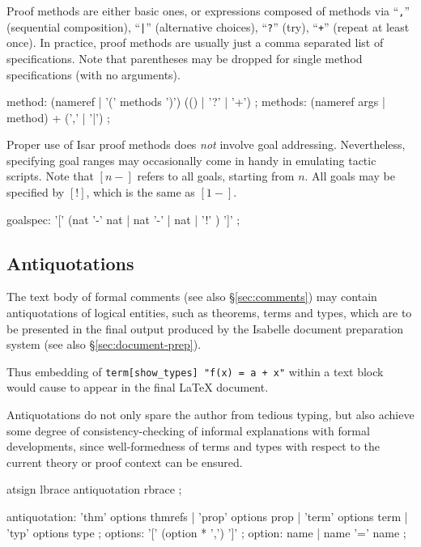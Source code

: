 Proof methods are either basic ones, or expressions composed of methods via
``\texttt{,}'' (sequential composition), ``\texttt{|}'' (alternative choices),
``\texttt{?}'' (try), ``\texttt{+}'' (repeat at least once).  In practice,
proof methods are usually just a comma separated list of
~ specifications.  Note that parentheses
may be dropped for single method specifications (with no arguments).

\begin{rail}
  method: (nameref | '(' methods ')') (() | '?' | '+')
  ;
  methods: (nameref args | method) + (',' | '|')
  ;
\end{rail}

Proper use of Isar proof methods does \emph{not} involve goal addressing.
Nevertheless, specifying goal ranges may occasionally come in handy in
emulating tactic scripts.  Note that $[n-]$ refers to all goals, starting from
$n$.  All goals may be specified by $[!]$, which is the same as $[1-]$.

\begin{rail}
  goalspec: '[' (nat '-' nat | nat '-' | nat | '!' ) ']'
  ;
\end{rail}


\subsection{Antiquotations}\label{sec:antiq}

The text body of formal comments (see also \S\ref{sec:comments}) may contain
antiquotations of logical entities, such as theorems, terms and types, which
are to be presented in the final output produced by the Isabelle document
preparation system (see also \S\ref{sec:document-prep}).

Thus embedding of
\texttt{{\at}{\ttlbrace}term[show_types]~"f(x)~=~a~+~x"{\ttrbrace}} within a
text block would cause
to appear in the final {\LaTeX} document.

\medskip

Antiquotations do not only spare the author from tedious typing, but also
achieve some degree of consistency-checking of informal explanations with
formal developments, since well-formedness of terms and types with respect to
the current theory or proof context can be ensured.

\begin{rail}
  atsign lbrace antiquotation rbrace
  ;

  antiquotation:
    'thm' options thmrefs |
    'prop' options prop |
    'term' options term |
    'typ' options type
  ;
  options: '[' (option * ',') ']'
  ;
  option: name | name '=' name
  ;
\end{rail}

